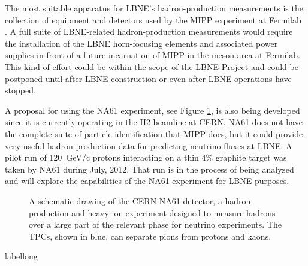 The most suitable apparatus for LBNE's hadron-production measurements
is the collection of equipment and detectors used by the MIPP experiment at Fermilab~
\cite{Isenhower:2006zp}.   
A full suite of LBNE-related
hadron-production measurements would require the installation of the LBNE horn-focusing
elements and associated power supplies in front of a future
incarnation of MIPP in the meson area at Fermilab.
This kind of effort could be within the scope of the LBNE Project and could be postponed
until after LBNE construction or even after LBNE operations have
stopped. 

A proposal for using the NA61 experiment, see Figure \ref{fig:NA61Scheme}, 
is also being developed since it is currently operating
in the H2 beamline at CERN. NA61 does not have the complete suite of particle identification that MIPP does, but it could provide very useful hadron-production data for predicting neutrino fluxes at LBNE.
A pilot run of 120~GeV/c protons interacting on a thin 4\% graphite target 
was taken by NA61 during July, 2012. That run is in the process of being analyzed and will explore the capabilities of the NA61 experiment for LBNE purposes. 

\begin{figure}[htbp]
\centering
\caption[NA61]
{A schematic drawing of the CERN NA61 detector, a hadron production and heavy ion experiment 
designed to measure hadrons over a large part of the relevant phase for 
neutrino experiments. The TPCs, shown in blue, can separate pions from protons 
and kaons.}
\label{fig:NA61Scheme}
\end{figure}
\begin{cdrfigure}[short]{label}{long}
\end{cdrfigure}
